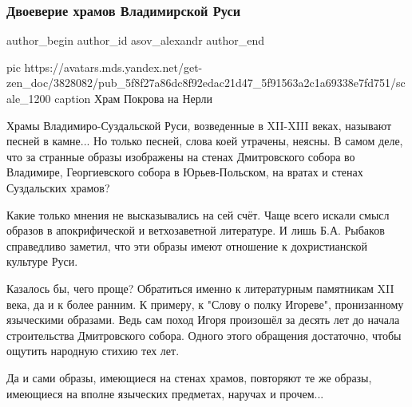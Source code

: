  
 
 
 
 
 
\subsubsection{Двоеверие храмов Владимирской Руси}
\label{sec:26_10_2020.sites.ru.zen_yandex.asov_alexandr.1.dvoeverie_hramov_vladimirskoj_rusi}
\ifcmt
  author_begin
   author_id asov_alexandr
  author_end
\fi


\ifcmt
pic https://avatars.mds.yandex.net/get-zen_doc/3828082/pub_5f8f27a86dc8f92edac21d47_5f91563a2c1a69338e7fd751/scale_1200
caption Храм Покрова на Нерли
\fi

Храмы Владимиро-Суздальской Руси, возведенные в XII-XIII веках, называют песней
в камне... Но только песней, слова коей утрачены, неясны. В самом деле, что за
странные образы изображены на стенах Дмитровского собора во Владимире,
Георгиевского собора в Юрьев-Польском, на вратах и стенах Суздальских храмов?

Какие только мнения не высказывались на сей счёт. Чаще всего искали смысл
образов в апокрифической и ветхозаветной литературе. И лишь Б.А. Рыбаков
справедливо заметил, что эти образы имеют отношение к дохристианской культуре
Руси.

Казалось бы, чего проще? Обратиться именно к литературным памятникам XII века,
да и к более ранним. К примеру, к "Слову о полку Игореве", пронизанному
языческими образами. Ведь сам поход Игоря произошёл за десять лет до начала
строительства Дмитровского собора. Одного этого обращения достаточно, чтобы
ощутить народную стихию тех лет.

Да и сами образы, имеющиеся на стенах храмов, повторяют те же образы, имеющиеся
на вполне языческих предметах, наручах и прочем...

